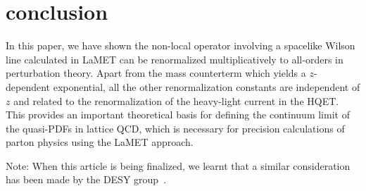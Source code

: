 \section{conclusion}
In this paper, we have shown the non-local operator involving a spacelike Wilson line calculated in LaMET can be renormalized multiplicatively to all-orders in perturbation theory. Apart from the mass counterterm which yields
a $z$-dependent exponential, all the other renormalization constants are independent of $z$ and related to the renormalization
of the heavy-light current in the HQET. This provides an important theoretical basis for defining the
continuum limit of the quasi-PDFs in lattice QCD, which is necessary for precision calculations of parton physics
using the LaMET approach.

Note: When this article is being finalized, we learnt that a similar consideration has been made by the DESY group~\cite{greentalk}.
